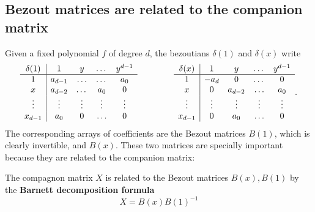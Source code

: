\documentclass{standalone}
\begin{document}
\subsection{Bezout matrices are related to the companion matrix}
\label{Bar}
Given a fixed polynomial $f$ of degree $d$, the bezoutians $\delta(1)$ and $\delta(x)$ write
\begin{equation}
	\begin{array}{c|cccc}
		\delta(1) & 1 & y & \dots & y^{d-1} \\
		\hline
		1 & a_{d-1} & \ldots & \dots & a_0 \\
		x & a_{d-2} & \dots & a_0 & 0 \\
		\vdots & \vdots & \vdots & \vdots & \vdots \\
		x_{d-1} & a_0 & 0 & \ldots & 0 \\
	\end{array}
	\hspace{1.5cm}
	\begin{array}{c|cccc}
		\delta(x) & 1 & y & \dots & y^{d-1} \\
		\hline
		1 & -a_{d} & 0 & \dots & 0 \\
		x & 0 & a_{d-2} & \ldots & a_0 \\
		\vdots & \vdots & \vdots & \vdots & \vdots \\
		x_{d-1} & 0 & a_0 & \ldots & 0 \\
	\end{array}.
\end{equation}
The corresponding arrays of coefficients are the Bezout matrices $B(1)$, which is clearly invertible, and $B(x)$. 
These two matrices are specially important because they are related to the companion matrix:
\begin{prop}
\label{Barnett}
The compagnon matrix $X$ is related to the Bezout matrices $B(x), B(1)$ by the {\bf Barnett decomposition formula}
\cite{Barnett}
\begin{equation}
	X = B(x)B(1)^{-1}
\end{equation}
\end{prop}
\end{document}
